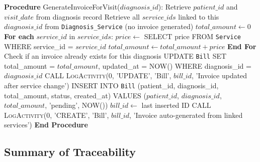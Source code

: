 \begin{algorithm}[H]
	\caption{Generate Invoice (called automatically)}
	\label{alg:generate-invoice}
	\begin{algorithmic}[1]
		\STATE \textbf{Procedure} GenerateInvoiceForVisit($diagnosis\_id$):
		\STATE \quad Retrieve $patient\_id$ and $visit\_date$ from diagnosis record
		\STATE \quad Retrieve all $service\_ids$ linked to this $diagnosis\_id$ from \texttt{Diagnosis\_Service}
		\RETURN (no invoice generated)
		\ENDIF
		\STATE \quad $total\_amount \leftarrow 0$
		\STATE \quad \textbf{For each} $service\_id$ in $service\_ids$:
		\STATE \qquad $price \leftarrow$ SELECT price FROM \texttt{Service} WHERE service\_id = $service\_id$
		\STATE \qquad $total\_amount \leftarrow total\_amount + price$
		\STATE \quad \textbf{End For}
		\STATE \quad Check if an invoice already exists for this diagnosis
		\STATE \quad UPDATE \texttt{Bill} SET total\_amount = $total\_amount$, updated\_at = NOW()
		WHERE diagnosis\_id = $diagnosis\_id$
		\STATE \quad CALL \textsc{LogActivity}(0, 'UPDATE', 'Bill', $bill\_id$, 'Invoice updated after service change')
		\ELSE
		\STATE \quad INSERT INTO \texttt{Bill} (patient\_id, diagnosis\_id, total\_amount, status, created\_at)
		VALUES ($patient\_id$, $diagnosis\_id$, $total\_amount$, 'pending', NOW())
		\STATE \quad $bill\_id \leftarrow$ last inserted ID
		\STATE \quad CALL \textsc{LogActivity}(0, 'CREATE', 'Bill', $bill\_id$, 'Invoice auto-generated from linked services')
		\ENDIF
		\STATE \textbf{End Procedure}
	\end{algorithmic}
\end{algorithm}

 \subsection{Summary of Traceability}
 
